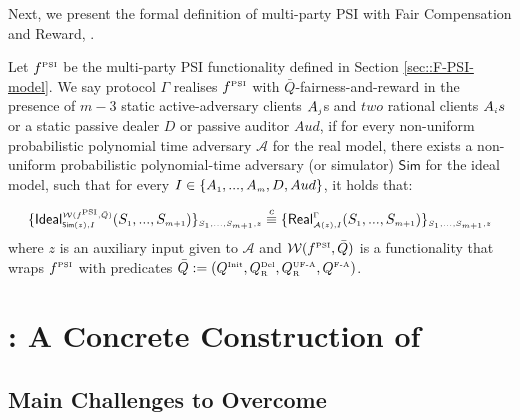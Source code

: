  
Next, we present the formal definition of multi-party PSI with Fair Compensation and Reward, \ep. 




\begin{definition}[\ep]\label{def::PSI-Q-fair-reward}
Let $f^{\scriptscriptstyle \text{PSI}}$ be the multi-party PSI functionality defined in Section \ref{sec::F-PSI-model}. We say  protocol $\Gamma$ realises  $f^{\scriptscriptstyle \text{PSI}}$ with $\bar Q$-fairness-and-reward in the presence of $m-3$ static active-adversary clients $A_{\scriptscriptstyle j}$s and $two$ rational clients $A_{\scriptscriptstyle i}s$ or a static passive dealer  $D$ or passive auditor $Aud$, if for every non-uniform probabilistic polynomial time adversary $\mathcal{A}$ for the real model, there exists a non-uniform probabilistic polynomial-time adversary (or simulator) $\mathsf{Sim}$ for the ideal model, such that for every $I\in \{A_{\scriptscriptstyle 1},...,A_{\scriptscriptstyle m}, D, Aud\}$, it holds that: 

\begin{equation*}
\{\mathsf {Ideal}^{\scriptscriptstyle \mathcal{W}(f^{\scriptscriptstyle \text{PSI}}, \bar Q)}_{\scriptscriptstyle \mathsf{Sim}(z), I}(S_{\scriptscriptstyle 1},..., S_{\scriptscriptstyle m+1})\}_{\scriptscriptstyle S_{\scriptscriptstyle 1},..., S_{\scriptscriptstyle m+1},z}\stackrel{c}{\equiv} \{\mathsf{Real}_{\scriptscriptstyle \mathcal{A}(z), I}^{\scriptscriptstyle \Gamma}(S_{\scriptscriptstyle 1},..., S_{\scriptscriptstyle m+1}) \}_{\scriptscriptstyle S_{\scriptscriptstyle 1},..., S_{\scriptscriptstyle m+1},z}
\end{equation*}
where  $z$ is an auxiliary input given to $\mathcal{A}$ and  $\mathcal{W}(f^{\scriptscriptstyle \text{PSI}}, \bar Q)$ is a functionality that wraps $f^{\scriptscriptstyle \text{PSI}}$ with predicates $\bar Q:=(Q^{\scriptscriptstyle \text{Init}},  Q^{\scriptscriptstyle \text{Del}}_{\scriptscriptstyle\text{R}}, Q^{\scriptscriptstyle \text{UF-A}}_{\scriptscriptstyle \text{R}}, Q^{\scriptscriptstyle \text{F-A}})$. 
  \end{definition}





\section{\withRew: A Concrete Construction of \ep}


\subsection{Main Challenges to Overcome}

